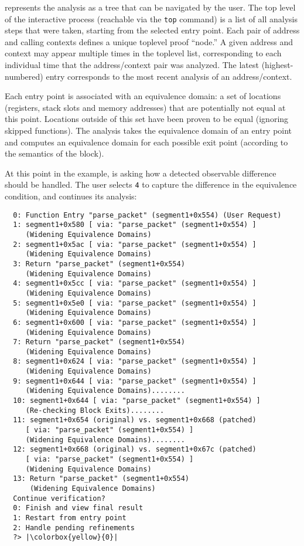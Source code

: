 \pate{} represents the analysis as a tree that can be navigated by the user.
The top level of the interactive process (reachable via the \texttt{top} command) is a list of all analysis steps that were taken, starting from the selected entry point.
Each pair of address and calling contexts defines a unique toplevel proof ``node.''
A given address and context may appear multiple times in the toplevel list, corresponding to each individual time that the address/context pair was analyzed.
The latest (highest-numbered) entry corresponds to the most recent analysis of an address/context.

Each entry point is associated with an equivalence domain: a set of locations (registers, stack slots and memory addresses) that are potentially not equal at this point.
Locations outside of this set have been proven to be equal (ignoring skipped functions).
The analysis takes the equivalence domain of an entry point and computes an equivalence domain for each possible exit point (according to the semantics of the block).

At this point in the example, \pate{} is asking how a detected observable difference should be handled.
The user selects \texttt{4} to capture the difference in the equivalence condition, and \pate{} continues its analysis:

\begin{lstlisting}
  0: Function Entry "parse_packet" (segment1+0x554) (User Request)
  1: segment1+0x580 [ via: "parse_packet" (segment1+0x554) ]
     (Widening Equivalence Domains)
  2: segment1+0x5ac [ via: "parse_packet" (segment1+0x554) ]
     (Widening Equivalence Domains)
  3: Return "parse_packet" (segment1+0x554)
     (Widening Equivalence Domains)
  4: segment1+0x5cc [ via: "parse_packet" (segment1+0x554) ]
     (Widening Equivalence Domains)
  5: segment1+0x5e0 [ via: "parse_packet" (segment1+0x554) ]
     (Widening Equivalence Domains)
  6: segment1+0x600 [ via: "parse_packet" (segment1+0x554) ]
     (Widening Equivalence Domains)
  7: Return "parse_packet" (segment1+0x554)
     (Widening Equivalence Domains)
  8: segment1+0x624 [ via: "parse_packet" (segment1+0x554) ]
     (Widening Equivalence Domains)
  9: segment1+0x644 [ via: "parse_packet" (segment1+0x554) ]
     (Widening Equivalence Domains)........
  10: segment1+0x644 [ via: "parse_packet" (segment1+0x554) ]
     (Re-checking Block Exits)........
  11: segment1+0x654 (original) vs. segment1+0x668 (patched)
     [ via: "parse_packet" (segment1+0x554) ]
     (Widening Equivalence Domains)........
  12: segment1+0x668 (original) vs. segment1+0x67c (patched)
     [ via: "parse_packet" (segment1+0x554) ]
     (Widening Equivalence Domains)
  13: Return "parse_packet" (segment1+0x554)
      (Widening Equivalence Domains)
  Continue verification?
  0: Finish and view final result
  1: Restart from entry point
  2: Handle pending refinements
  ?> |\colorbox{yellow}{0}|
\end{lstlisting}

